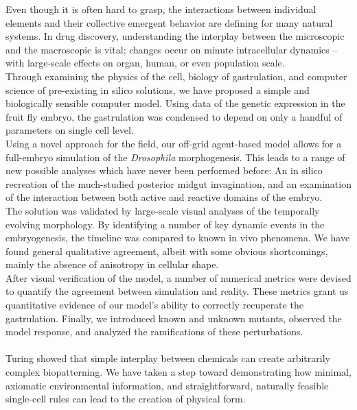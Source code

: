Even though it is often hard to grasp, the interactions between individual elements and their collective emergent behavior are defining for many natural systems. In drug discovery, understanding the interplay between the microscopic and the macroscopic is vital; changes occur on minute intracellular dynamics -- with large-scale effects on organ, human, or even population scale.\\ 

Through examining the physics of the cell, biology of gastrulation, and computer science of pre-existing in silico solutions, we have proposed a simple and biologically sensible computer model. Using data of the genetic expression in the fruit fly embryo, the gastrulation was condensed to depend on only a handful of parameters on single cell level. \\

Using a novel approach for the field, our off-grid agent-based model allows for a full-embryo simulation of the \textit{Drosophila} morphogenesis. This leads to a range of new possible analyses which have never been performed before: An in silico recreation of the much-studied posterior midgut invagination, and an examination of the interaction between both active and reactive domains of the embryo. \\

The solution was validated by large-scale visual analyses of the temporally evolving morphology. By identifying a number of key dynamic events in the embryogenesis, the timeline was compared to known in vivo phenomena. We have found general qualitative agreement, albeit with some obvious shortcomings, mainly the absence of anisotropy in cellular shape.\\

After visual verification of the model, a number of numerical metrics were devised to quantify the agreement between simulation and reality. These metrics grant us quantitative evidence of our model's ability to correctly recuperate the gastrulation. Finally, we introduced known and unknown mutants, observed the model response, and analyzed the ramifications of these perturbations. \\\\

Turing showed that simple interplay between chemicals can create arbitrarily complex biopatterning. We have taken a step toward demonstrating how minimal, axiomatic environmental information, and straightforward, naturally feasible single-cell rules can lead to the creation of physical form.\\


